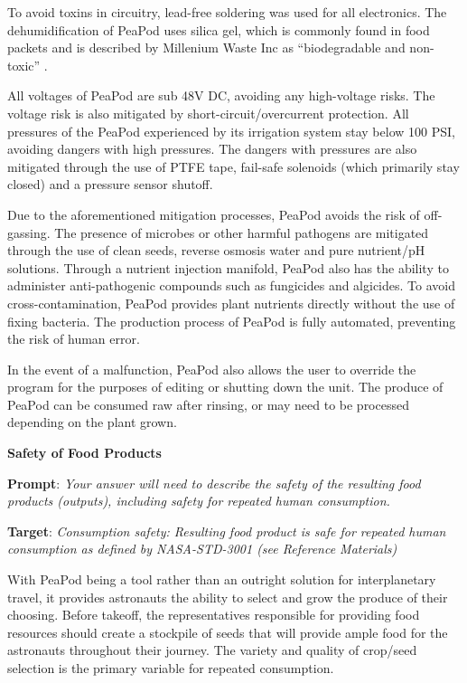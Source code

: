 \documentclass{report}
\begin{document}
To avoid toxins in circuitry, lead-free soldering was used for all electronics. The dehumidification of PeaPod uses silica gel, which is commonly found in food packets and is described by Millenium Waste Inc as “biodegradable and non-toxic” %
. 

All voltages of PeaPod are sub 48V DC, avoiding any high-voltage risks. The voltage risk is also mitigated by short-circuit/overcurrent protection. 
All pressures of the PeaPod experienced by its irrigation system stay below 100 PSI, avoiding dangers with high pressures. The dangers with pressures are also mitigated through the use of PTFE tape, fail-safe solenoids (which primarily stay closed) and a pressure sensor shutoff. 

Due to the aforementioned mitigation processes, PeaPod avoids the risk of off-gassing. The presence of microbes or other harmful pathogens are mitigated through the use of clean seeds, reverse osmosis water and pure nutrient/pH solutions. Through a nutrient injection manifold, PeaPod also has the ability to administer anti-pathogenic compounds such as fungicides and algicides. 
To avoid cross-contamination, PeaPod provides plant nutrients directly without the use of fixing bacteria. The production process of PeaPod is fully automated, preventing the risk of human error. 

In the event of a malfunction, PeaPod also allows the user to override the program for the purposes of editing or shutting down the unit. The produce of PeaPod can be consumed raw after rinsing, or may need to be processed depending on the plant grown. 

\textbf{Safety of Food Products}
\label{sec:safety-products}

\textbf{Prompt}: \textit{Your answer will need to describe the safety of the resulting food products (outputs), including safety for repeated human consumption.}

\textbf{Target}: \textit{Consumption safety: Resulting food product is safe for repeated human consumption as defined by NASA-STD-3001 (see Reference Materials)}


With PeaPod being a tool rather than an outright solution for interplanetary travel, it provides astronauts the ability to select and grow the produce of their choosing. Before takeoff, the representatives responsible for providing food resources should create a stockpile of seeds that will provide ample food for the astronauts throughout their journey. The variety and quality of crop/seed selection is the primary variable for repeated consumption.
\end{document}
